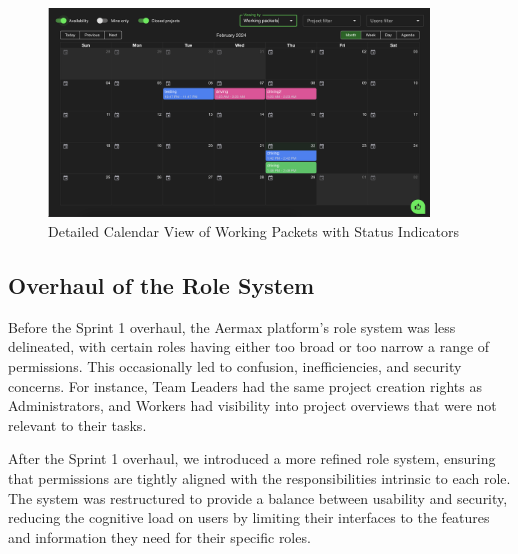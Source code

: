 \begin{figure}[H]
    \centering
    \includegraphics[width=0.9\textwidth]{src/assets/chapters/calendar2.png}
    \caption{Detailed Calendar View of Working Packets with Status Indicators}
    \label{fig:detailed_calendar_view}
\end{figure}



\subsection{Overhaul of the Role System}
Before the Sprint 1 overhaul, the Aermax platform's role system was less delineated, with certain roles having either too broad or too narrow a range of permissions. This occasionally led to confusion, inefficiencies, and security concerns. For instance, Team Leaders had the same project creation rights as Administrators, and Workers had visibility into project overviews that were not relevant to their tasks.

After the Sprint 1 overhaul, we introduced a more refined role system, ensuring that permissions are tightly aligned with the responsibilities intrinsic to each role. The system was restructured to provide a balance between usability and security, reducing the cognitive load on users by limiting their interfaces to the features and information they need for their specific roles.

